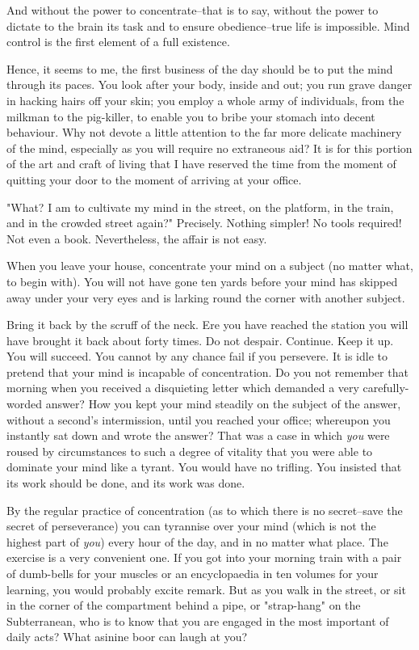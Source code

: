 And without the power to concentrate--that is to say, without the power
to dictate to the brain its task and to ensure obedience--true life is
impossible. Mind control is the first element of a full existence.

Hence, it seems to me, the first business of the day should be to put
the mind through its paces.  You look after your body, inside and out;
you run grave danger in hacking hairs off your skin; you employ a whole
army of individuals, from the milkman to the pig-killer, to enable you
to bribe your stomach into decent behaviour. Why not devote a little
attention to the far more delicate machinery of the mind, especially as
you will require no extraneous aid?  It is for this portion of the art
and craft of living that I have reserved the time from the moment of
quitting your door to the moment of arriving at your office.

"What?  I am to cultivate my mind in the street, on the platform, in
the train, and in the crowded street again?"  Precisely.  Nothing
simpler! No tools required!  Not even a book.  Nevertheless, the affair
is not easy.

When you leave your house, concentrate your mind on a subject (no
matter what, to begin with).  You will not have gone ten yards before
your mind has skipped away under your very eyes and is larking round
the corner with another subject.

Bring it back by the scruff of the neck.  Ere you have reached the
station you will have brought it back about forty times.  Do not
despair.  Continue. Keep it up.  You will succeed.  You cannot by any
chance fail if you persevere.  It is idle to pretend that your mind is
incapable of concentration. Do you not remember that morning when you
received a disquieting letter which demanded a very carefully-worded
answer?  How you kept your mind steadily on the subject of the answer,
without a second's intermission, until you reached your office;
whereupon you instantly sat down and wrote the answer?  That was a case
in which \textit{you} were roused by circumstances to such a degree of
vitality that you were able to dominate your mind like a tyrant. You
would have no trifling.  You insisted that its work should be done, and
its work was done.

By the regular practice of concentration (as to which there is no
secret--save the secret of perseverance) you can tyrannise over your
mind (which is not the highest part of \textit{you}) every hour of the day,
and in no matter what place.  The exercise is a very convenient one.
If you got into your morning train with a pair of dumb-bells for your
muscles or an encyclopaedia in ten volumes for your learning, you would
probably excite remark.  But as you walk in the street, or sit in the
corner of the compartment behind a pipe, or "strap-hang" on the
Subterranean, who is to know that you are engaged in the most important
of daily acts?  What asinine boor can laugh at you?

